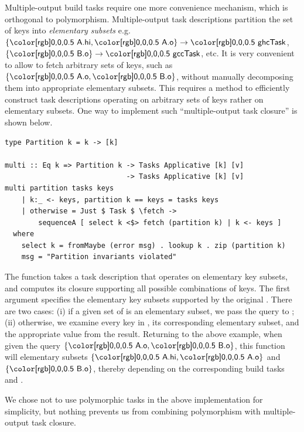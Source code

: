 Multiple-output build tasks require one more convenience mechanism,
which is orthogonal to polymorphism. Multiple-output task descriptions partition
the set of keys into \emph{elementary subsets} e.g.
$\{\cmd{A.hi},\cmd{A.o}\} \rightarrow \cmd{ghcTask}$,
$\{\cmd{B.o}\} \rightarrow \cmd{gccTask}$, etc. It is very convenient to
allow to fetch arbitrary sets of keys, such as $\{\cmd{A.o},\cmd{B.o}\}$,
without manually decomposing them into appropriate elementary subsets. This
requires a method to efficiently construct task descriptions operating on
arbitrary sets of keys rather on elementary subsets. One way to implement such
``multiple-output task closure'' is shown below.

\vspace{1mm}
\begin{verbatim}
type Partition k = k -> [k]

multi :: Eq k => Partition k -> Tasks Applicative [k] [v]
                             -> Tasks Applicative [k] [v]
multi partition tasks keys
    | k:_ <- keys, partition k == keys = tasks keys
    | otherwise = Just $ Task $ \fetch ->
        sequenceA [ select k <$> fetch (partition k) | k <- keys ]
  where
    select k = fromMaybe (error msg) . lookup k . zip (partition k)
    msg = "Partition invariants violated"
\end{verbatim}
\vspace{1mm}

\noindent
The function  takes a task description  that operates on
elementary key subsets, and computes its closure supporting all possible
combinations of keys. The first argument  specifies the elementary
key subsets supported by the original . There are two cases: (i) if a
given set of  is an elementary subset, we pass the query to ;
(ii) otherwise, we examine every key  in ,  its
corresponding elementary subset, and  the appropriate value from the
result. Returning to the above example, when given the query
$\{\cmd{A.o},\cmd{B.o}\}$, this function will  elementary subsets
$\{\cmd{A.hi},\cmd{A.o}\}$ and $\{\cmd{B.o}\}$, thereby depending on the
corresponding build tasks  and .

We chose not to use polymorphic tasks in the above implementation for
simplicity, but nothing prevents us from combining polymorphism with
multiple-output task closure.


